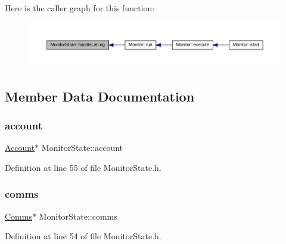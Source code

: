 Here is the caller graph for this function\+:
\nopagebreak
\begin{figure}[H]
\begin{center}
\leavevmode
\includegraphics[width=350pt]{dd/d45/class_monitor_state_a8c8b871e3e8308e11f35905dd8741878_icgraph}
\end{center}
\end{figure}


\subsection{Member Data Documentation}
\mbox{\label{class_monitor_state_a41128d4942ec0d5b107c63d1d95af811}} 
\subsubsection{\texorpdfstring{account}{account}}
{\footnotesize\ttfamily \hyperlink{class_account}{Account}$\ast$ Monitor\+State\+::account\hspace{0.3cm}{\ttfamily [protected]}}



Definition at line 55 of file Monitor\+State.\+h.

\mbox{\label{class_monitor_state_a41914e9963c67ef2d17774f04bad3518}} 
\subsubsection{\texorpdfstring{comms}{comms}}
{\footnotesize\ttfamily \hyperlink{class_comms}{Comms}$\ast$ Monitor\+State\+::comms\hspace{0.3cm}{\ttfamily [protected]}}



Definition at line 54 of file Monitor\+State.\+h.

\mbox{\label{class_monitor_state_aaeef0ae307bb9cfcbb4fcb08c115fb0f}} 
